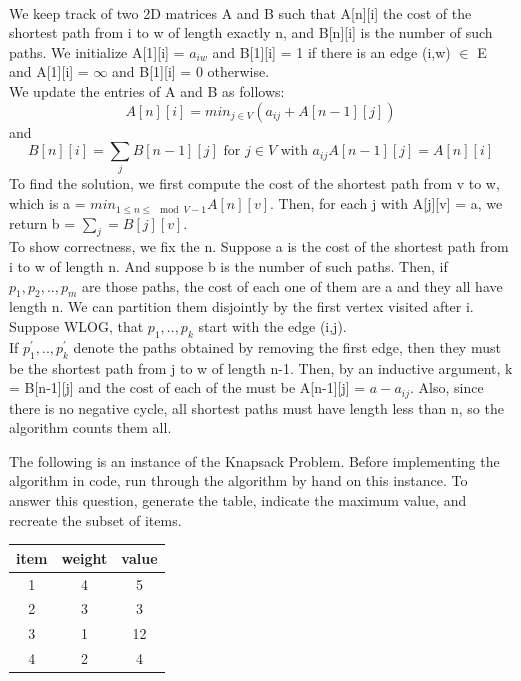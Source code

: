 \documentclass[solutionorbox,answers]{exam}
\begin{document}
\begin{questions}
  \begin{solutionbox}{} \vspace{1em} \\
  We keep track of two 2D matrices A and B such that A[n][i] the cost of the shortest path from i to w of length exactly n, and B[n][i] is the number of such paths. We initialize A[1][i] = $a_{iw}$ and B[1][i] = 1 if there is an edge (i,w) $\in$ E and A[1][i] = $\infty$ and B[1][i] = 0 otherwise.\\
  We update the entries of A and B as follows:\\
  \[ A[n][i] = min_{j \in V} (a_{ij} + A[n-1][j])\]
  and
  \[ B[n][i]= \sum_{j} B[n-1][j] \text{\ \ \ \ for $j \in V$ with $a_{ij} A[n-1][j] = A[n][i]$}\]
  To find the solution, we first compute the cost of the shortest path from v to w, which is a = $min_{1 \leq n \leq \mod{V} -1} A[n][v]$. Then, for each j with A[j][v] = a, we return b = $\sum_{j} = B[j][v]$.\\
  To show correctness, we fix the n. Suppose a is the cost of the shortest path from i to w of length n. And suppose b is the number of such paths. Then, if $p_{1}, p_{2},..,p_{m}$ are those paths, the cost of each one of them are a and they all have length n. We can partition them disjointly by the first vertex visited after i. Suppose WLOG, that $p_{1},..,p_{k}$ start with the edge (i,j).\\
  If $p_{1}^{'},..,p_{k}^{'}$ denote the paths obtained by removing the first edge, then they must be the shortest path from j to w of length n-1. Then, by an inductive argument, k = B[n-1][j] and the cost of each of the must be A[n-1][j] = $a - a_{ij}$. Also, since there is no negative cycle, all shortest paths must have length less than n, so the algorithm counts them all.
  \end{solutionbox}

\newpage


\question The following is an instance of the Knapsack Problem. 
Before implementing the algorithm in code, run through the algorithm by hand on this instance. 
To answer this question, generate the table, indicate the maximum value, and recreate the subset of items.

\begin{center}
\begin{tabular}{ |c|c|c| } 
 \hline
 item & weight & value \\ 
\hline
\hline
 1 & 4 & 5 \\ 
\hline
 2 & 3 & 3 \\ 
\hline
 3 & 1 & 12 \\ 
\hline
 4 & 2 & 4 \\ 
 \hline
\end{tabular}


\end{center}
\end{questions}
\end{document}
